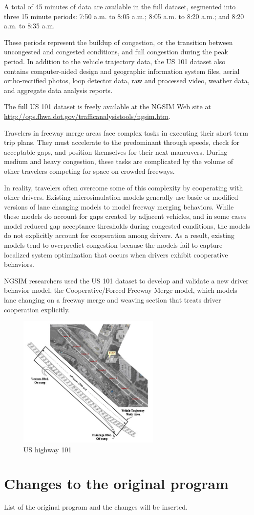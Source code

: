 A total of 45 minutes of data are available in the full dataset, segmented into three 15 minute periods: 7:50 a.m. to 8:05 a.m.; 8:05 a.m. to 8:20 a.m.; and 8:20 a.m. to 8:35 a.m.

These periods represent the buildup of congestion, or the transition between uncongested and congested conditions, and full congestion during the peak period. In addition to the vehicle trajectory data, the US 101 dataset also contains computer-aided design and geographic information system files, aerial ortho-rectified photos, loop detector data, raw and processed video, weather data, and aggregate data analysis reports.

The full US 101 dataset is freely available at the NGSIM Web site at \url{http://ops.fhwa.dot.gov/trafficanalysistools/ngsim.htm}.

Travelers in freeway merge areas face complex tasks in executing their short term trip plans. They must accelerate to the predominant through speeds, check for acceptable gaps, and position themselves for their next maneuvers. During medium and heavy congestion, these tasks are complicated by the volume of other travelers competing for space on crowded freeways.

In reality, travelers often overcome some of this complexity by cooperating with other drivers. Existing microsimulation models generally use basic or modified versions of lane changing models to model freeway merging behaviors. While these models do account for gaps created by adjacent vehicles, and in some cases model reduced gap acceptance thresholds during congested conditions, the models do not explicitly account for cooperation among drivers. As a result, existing models tend to overpredict congestion because the models fail to capture localized system optimization that occurs when drivers exhibit cooperative behaviors.

NGSIM researchers used the US 101 dataset to develop and validate a new driver behavior model, the Cooperative/Forced Freeway Merge model, which models lane changing on a freeway merge and weaving section that treats driver cooperation explicitly.

\begin{figure}[H]
\begin{center}
\includegraphics[width=7cm]{./figures/07030fig1.jpg}
\caption{US highway 101}
\label{fig:pict_us80}
\end{center}
\end{figure}



\section{Changes to the original program}


List of the original program and the changes will be inserted.

